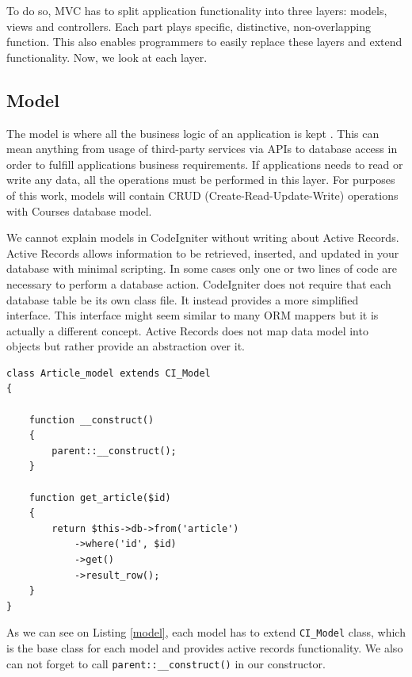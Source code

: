 
To do so, MVC has to split application functionality into three layers: models, views and controllers. Each part plays specific, distinctive, non-overlapping function. This also enables programmers to easily replace these layers and extend functionality. Now, we look at each layer.


\subsection{Model}
The model is where all the business logic of an application is kept \cite{phpmvc}. This can mean anything from usage of third-party services via APIs to database access in order to fulfill applications business requirements. If applications needs to read or write any data, all the operations must be performed in this layer. For purposes of this work, models will contain CRUD (Create-Read-Update-Write) operations with Courses database model.

We cannot explain models in CodeIgniter without writing about Active Records. Active Records allows information to be retrieved, inserted, and updated in your database with minimal scripting. In some cases only one or two lines of code are necessary to perform a database action. CodeIgniter does not require that each database table be its own class file. It instead provides a more simplified interface\cite{codeigniter}. This interface might seem similar to many ORM mappers but it is actually a different concept. Active Records does not map data model into objects but rather provide an abstraction over it.

\begin{lstlisting}[label={model}, caption={Article model}]
class Article_model extends CI_Model
{

    function __construct()
    {
        parent::__construct();
    }

    function get_article($id)
    {
        return $this->db->from('article')
            ->where('id', $id)
            ->get()
            ->result_row();
    }
}
\end{lstlisting}

As we can see on Listing \ref{model}, each model has to extend \texttt{CI\_Model} class, which is the base class for each model and provides active records functionality. We also can not forget to call \texttt{parent::\_\_construct()} in our constructor.

